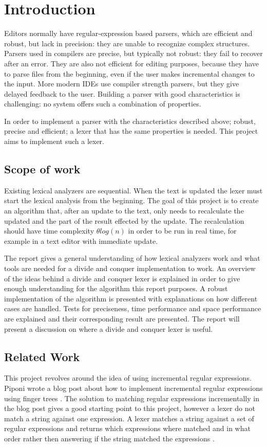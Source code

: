 \chapter{Introduction}
Editors normally have regular-expression based parsers, which are efficient and
robust, but lack in precision: they are unable to recognize complex structures.
Parsers used in compilers are precise, but typically not robust: they fail to
recover after an error. They are also not efficient for editing purposes,
because they have to parse files from the beginning, even if the user makes
incremental changes to the input. More modern IDEs use compiler strength
parsers, but they give delayed feedback to the user. Building a parser with good
characteristics is challenging: no system offers such a combination of
properties.

In order to implement a parser with the characteristics described above; robust,
precise and efficient; a lexer that has the same properties is needed. This
project aims to implement such a lexer.

\section{Scope of work}
Existing lexical analyzers are sequential. When the text is updated the lexer
must start the lexical analysis from the beginning. The goal of this project is
to create an algorithm that, after an update to the text, only needs to
recalculate the updated and the part of the result effected by the update. The
recalculation should have time complexity $\theta log(n)$ in order to be run in
real time, for example in a text editor with immediate update.

The report gives a general understanding of how lexical analyzers work and what
tools are needed for a divide and conquer implementation to work. An overview of
the ideas behind a divide and conquer lexer is explained in order to give enough
understanding for the algorithm this report purposes. A robust implementation of
the algorithm is presented with explanations on how different cases are handled.
Tests for preciseness, time performance and space performance are explained and
their corresponding result are presented. The report will present a discussion
on where a divide and conquer lexer is useful.

\section{Related Work}
This project revolves around the idea of using incremental regular expressions.
Piponi wrote a blog post about how to implement incremental regular
expressions using finger trees \cite{blog}. The solution to matching regular expressions
incrementally in the blog post gives a good starting point to this project,
however a lexer do not match a string against one expression. A lexer matches a
string against a set of regular expressions and returns which expressions where
matched and in what order rather then answering if the string matched the
expressions \cite{blog}.

